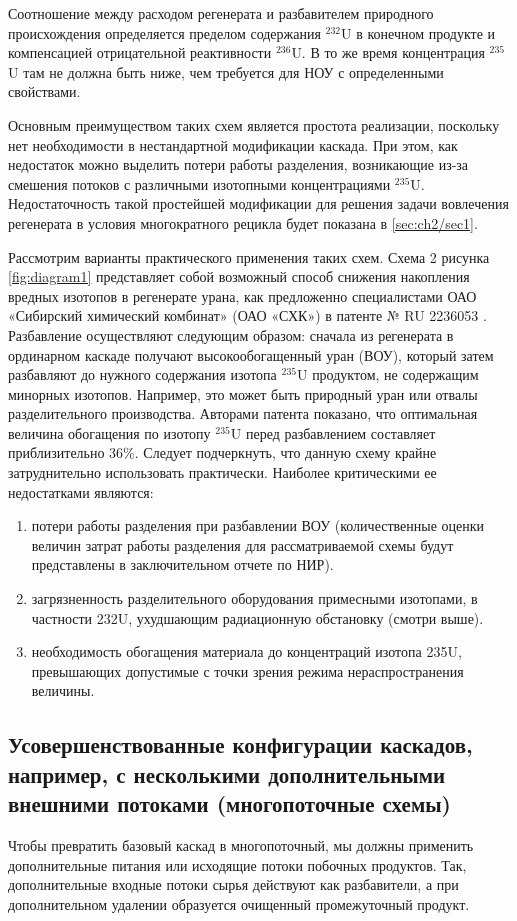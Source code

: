 Соотношение между расходом регенерата и разбавителем природного происхождения определяется пределом содержания $^{232}$U в конечном продукте и компенсацией отрицательной реактивности $^{236}$U. В то же время концентрация $^{235}$U там не должна быть ниже, чем требуется для НОУ с определенными свойствами.

Основным преимуществом таких схем является простота реализации, поскольку нет необходимости в нестандартной модификации каскада. При этом, как недостаток можно выделить потери работы разделения, возникающие из-за смешения потоков с различными изотопными концентрациями $^{235}$U. 
Недостаточность такой простейшей модификации для решения задачи вовлечения регенерата в условия многократного рецикла будет показана в \ref{sec:ch2/sec1}.

Рассмотрим варианты практического применения таких схем. Схема 2 рисунка \ref{fig:diagram1} представляет собой возможный способ снижения накопления вредных изотопов в регенерате урана, как предложенно специалистами ОАО «Сибирский химический комбинат» (ОАО «СХК») в патенте № RU 2236053 \cite{SposobIzotopnogoVosstanovleniyaa}. Разбавление осуществляют следующим образом: сначала из регенерата в ординарном каскаде получают высокообогащенный уран (ВОУ), который затем разбавляют до нужного содержания изотопа $^{235}$U продуктом, не содержащим минорных изотопов. Например, это может быть природный уран или отвалы разделительного производства. Авторами патента показано, что оптимальная величина обогащения по изотопу $^{235}$U перед разбавлением составляет приблизительно 36\%. Следует подчеркнуть, что данную схему крайне затруднительно использовать практически. Наиболее критическими ее недостатками являются: 
\begin{enumerate}
  \item потери работы разделения при разбавлении ВОУ (количественные оценки величин затрат работы разделения для рассматриваемой схемы будут представлены в заключительном отчете по НИР).
  \item загрязненность разделительного оборудования примесными изотопами, в частности 232U, ухудшающим радиационную обстановку (смотри выше).
  \item необходимость обогащения материала до концентраций изотопа 235U, превышающих допустимые с точки зрения режима нераспространения величины.
\end{enumerate}

\subsection{Усовершенствованные конфигурации каскадов, например, с несколькими дополнительными внешними потоками (многопоточные схемы)}\label{sec:ch1/sec2.2}
Чтобы превратить базовый каскад в многопоточный, мы должны применить дополнительные питания или исходящие потоки побочных продуктов. Так, дополнительные входные потоки сырья действуют как разбавители, а при дополнительном удалении образуется очищенный промежуточный продукт.

